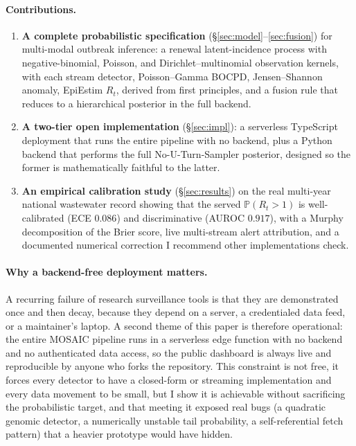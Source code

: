 \documentclass[10pt,twocolumn]{article}
\theoremstyle{definition}
\newcommand{\Rt}{R_t}
\newcommand{\Prob}{\mathbb{P}}
\begin{document}
\paragraph{Contributions.}
\begin{enumerate}[leftmargin=1.4em,itemsep=2pt,topsep=2pt]
\item \textbf{A complete probabilistic specification} (\S\ref{sec:model}--\ref{sec:fusion})
for multi-modal outbreak inference: a renewal latent-incidence process with
negative-binomial, Poisson, and Dirichlet--multinomial observation kernels, with
each stream detector, Poisson--Gamma BOCPD, Jensen--Shannon anomaly, EpiEstim
$\Rt$, derived from first principles, and a fusion rule that reduces to a
hierarchical posterior in the full backend.
\item \textbf{A two-tier open implementation} (\S\ref{sec:impl}): a serverless
TypeScript deployment that runs the entire pipeline with no backend, plus a
Python backend that performs the full No-U-Turn-Sampler posterior, designed so
the former is mathematically faithful to the latter.
\item \textbf{An empirical calibration study} (\S\ref{sec:results}) on the real
multi-year national wastewater record showing that the served $\Prob(\Rt>1)$ is
well-calibrated (ECE $0.086$) and discriminative (AUROC $0.917$), with a Murphy
decomposition of the Brier score, live multi-stream alert attribution, and a
documented numerical correction I recommend other implementations check.
\end{enumerate}

\paragraph{Why a backend-free deployment matters.}
A recurring failure of research surveillance tools is that they are demonstrated
once and then decay, because they depend on a server, a credentialed data feed,
or a maintainer's laptop. A second theme of this paper is therefore
operational: the entire MOSAIC pipeline runs in a serverless edge
function with no backend and no authenticated data access, so the public
dashboard is always live and reproducible by anyone who forks the repository.
This constraint is not free, it forces every detector to have a closed-form or
streaming implementation and every data movement to be small, but I show it is
achievable without sacrificing the probabilistic target, and that meeting it
exposed real bugs (a quadratic genomic detector, a numerically unstable tail
probability, a self-referential fetch pattern) that a heavier prototype would
have hidden.
\end{document}
